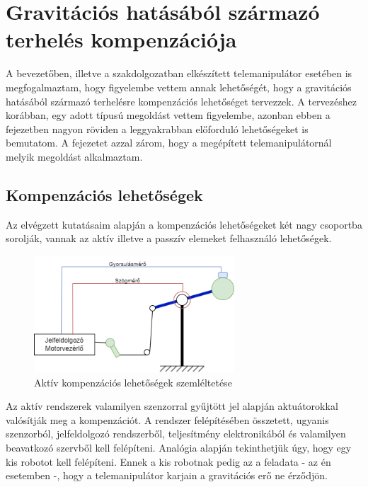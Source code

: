 \chapter{Gravitációs hatásából származó terhelés kompenzációja}
\label{sec:grav_komp}

A bevezetőben, illetve a szakdolgozatban elkészített telemanipulátor esetében is megfogalmaztam, hogy figyelembe vettem annak lehetőségét, hogy a gravitációs hatásából származó terhelésre kompenzációs lehetőséget tervezzek. A tervezéshez korábban, egy adott típusú megoldást vettem figyelembe, azonban ebben a fejezetben nagyon röviden a leggyakrabban előforduló lehetőségeket is bemutatom. A fejezetet azzal zárom, hogy a megépített telemanipulátornál melyik megoldást alkalmaztam.

\section{Kompenzációs lehetőségek}

Az elvégzett kutatásaim alapján a kompenzációs lehetőségeket két nagy csoportba sorolják, vannak az aktív illetve a passzív elemeket felhasználó lehetőségek.\cite{gravkomp}

\begin{figure}[!h]
\centering
\includegraphics[width=75mm, keepaspectratio]{figures/Diagrammok/Kompenzacios_lehetosegek_aktiv}
\caption{Aktív kompenzációs lehetőségek szemléltetése}
\label{fig:Kompenzacios_lehetosegek_aktív}
\end{figure}

Az aktív rendszerek valamilyen szenzorral gyűjtött jel alapján aktuátorokkal valósítják meg a kompenzációt. A rendszer felépítésében összetett, ugyanis szenzorból, jelfeldolgozó rendszerből, teljesítmény elektronikából és valamilyen beavatkozó szervből kell felépíteni. Analógia alapján tekinthetjük úgy, hogy egy kis robotot kell felépíteni. Ennek a kis robotnak pedig az a feladata - az én esetemben -, hogy a telemanipulátor karjain a gravitációs erő ne érződjön.\cite{gravkomp}


